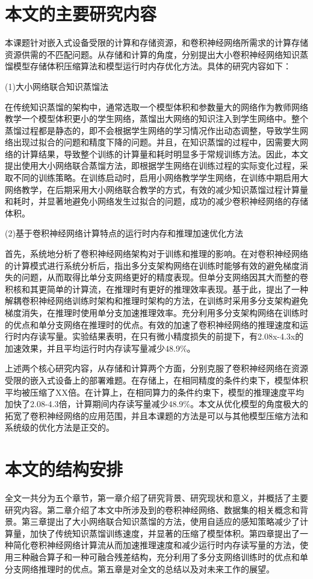 \section{本文的主要研究内容}

本课题针对嵌入式设备受限的计算和存储资源，和卷积神经网络所需求的计算存储资源供需的不匹配问题。从存储和计算的角度，分别提出大小卷积神经网络知识蒸馏模型存储体积压缩算法和模型运行时内存优化方法。具体的研究内容如下：

(1)大小网络联合知识蒸馏法

在传统知识蒸馏的架构中，通常选取一个模型体积和参数量大的网络作为教师网络教学一个模型体积更小的学生网络，蒸馏出大网络的知识注入到学生网络中。整个蒸馏过程都是静态的，即不会根据学生网络的学习情况作出动态调整，导致学生网络出现过拟合的问题和精度下降的问题。并且，在知识蒸馏的过程中，因需要大网络的计算结果，导致整个训练的计算量和耗时明显多于常规训练方法。因此，本文提出使用大小网络联合蒸馏方法，即根据学生网络在训练过程的实际变化过程，采取不同的训练策略。在训练启动时，启用小网络教学学生网络，在训练中期启用大网络教学，在后期采用大小网络联合教学的方式，有效的减少知识蒸馏过程计算量和耗时，并显著地避免小网络发生过拟合的问题，成功的减少卷积神经网络的存储体积。

(2)基于卷积神经网络计算特点的运行时内存和推理加速优化方法

首先，系统地分析了卷积神经网络架构对于训练和推理的影响。在对卷积神经网络的计算模式进行系统分析后，指出多分支架构网络在训练时能够有效的避免梯度消失的问题，从而取得比单分支网络更好的精度表现。但单分支网络因其大而整的卷积核和其更简单的计算流，在推理时有更好的推理效率表现。基于此，提出了一种解耦卷积神经网络训练时架构和推理时架构的方法，在训练时采用多分支架构避免梯度消失，在推理时使用单分支加速推理效率。充分利用多分支架构网络在训练时的优点和单分支网络在推理时的优点。有效的加速了卷积神经网络的推理速度和运行时内存读写量。实验结果表明，在只有微小精度损失的前提下，有2.08x-4.3x的加速效果，并且平均运行时内存读写量减少48.9\%。

上述两个核心研究内容，从存储和计算两个方面，分别克服了卷积神经网络在资源受限的嵌入式设备上的部署难题。在存储上，在相同精度的条件约束下，模型体积平均被压缩了XX倍。在计算上，在相同算力的条件约束下，模型的推理速度平均加快了2.08-4.3倍，计算期间内存读写量减少48.9\%。本文从优化模型的角度极大的拓宽了卷积神经网络的应用范围，并且本课题的方法是可以与其他模型压缩方法和系统级的优化方法是正交的。

\section{本文的结构安排}
全文一共分为五个章节，第一章介绍了研究背景、研究现状和意义，并概括了主要研究内容。第二章介绍了本文中所涉及到的卷积神经网络、数据集的相关概念和背景。第三章提出了大小网络联合知识蒸馏的方法，使用自适应的感知策略减少了计算量，加快了传统知识蒸馏训练速度，并显著的压缩了模型体积。第四章提出了一种简化卷积神经网络计算流从而加速推理速度和减少运行时内存读写量的方法，使用三种融合算子和一种可融合残差结构，充分利用了多分支网络训练时的优点和单分支网络推理时的优点。第五章是对全文的总结以及对未来工作的展望。

